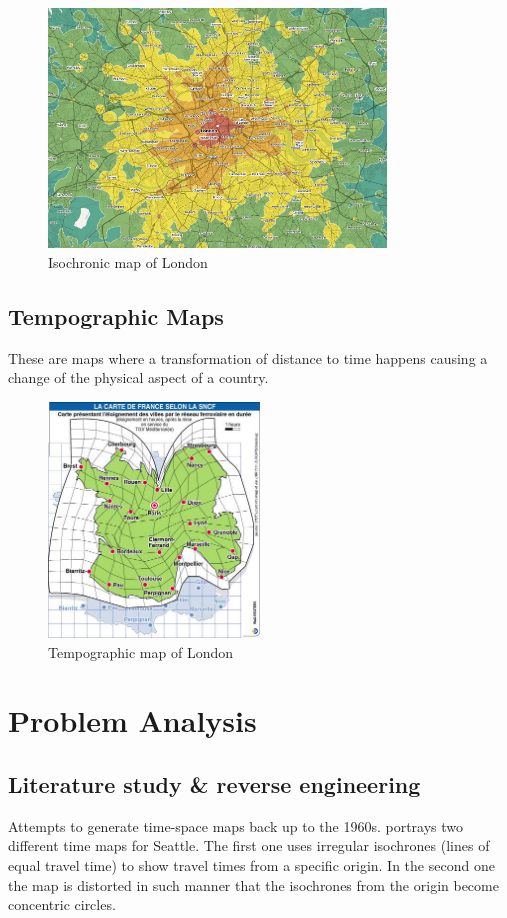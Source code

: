\documentclass[a4paper,11pt]{article}
\begin{document}
\begin{figure}[h!]
  \centering
  \includegraphics[width=0.8\textwidth]{London.png}
  \caption{Isochronic map of London}
  \label{london}
\end{figure}

\subsection{Tempographic Maps}
These are maps where a transformation of distance to time happens causing a change of
the physical aspect of a country.

\begin{figure}[h!]
  \centering
  \includegraphics[width=0.5\textwidth]{france.png}
  \caption{Tempographic map of London}
  \label{london}
\end{figure}

\section{Problem Analysis}
\subsection{Literature study \& reverse engineering}
Attempts to generate time-space maps back up to the 1960s.  portrays two
different time maps for Seattle. The first one uses irregular isochrones (lines of equal travel
time) to show travel times from a specific origin. In the second one the map is distorted in
such manner that the isochrones from the origin become concentric circles.
\end{document}
